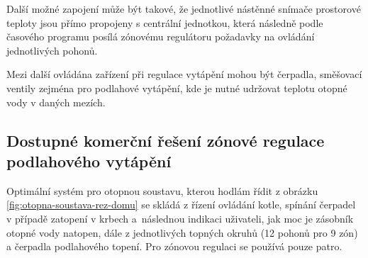 Další možné zapojení může být takové, že jednotlivé nástěnné snímače prostorové teploty jsou přímo propojeny s centrální jednotkou, která následně podle časového programu posílá zónovému regulátoru požadavky na ovládání jednotlivých pohonů. 

Mezi další ovládána zařízení při regulace vytápění mohou být čerpadla, směšovací ventily zejména pro podlahové vytápění, kde je nutné udržovat teplotu otopné vody v daných mezích.

\subsection{Dostupné komerční řešení zónové regulace podlahového vytápění}

Optimální systém pro otopnou soustavu, kterou hodlám řídit z obrázku \ref{fig:otopna-soustava-rez-domu} se skládá z řízení ovládání kotle, spínání čerpadel v případě zatopení v krbech a~následnou indikaci uživateli, jak moc je zásobník otopné vody natopen, dále z jednotlivých topných okruhů (12 pohonů pro 9 zón) a čerpadla podlahového topení. Pro zónovou regulaci se používá pouze patro.

